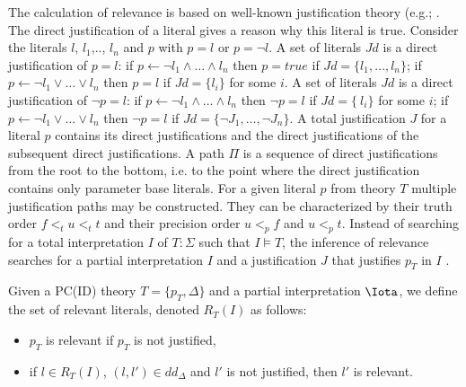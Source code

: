 The calculation of relevance is based on well-known justification theory (e.g.; \cite{Denecker93, Denecker2015}.
The direct justification of a literal gives a reason why this literal is true.
Consider the literals $l$, $l_1$,.., $l_n$ and $p$ with $p=l$ or $p=\neg l$.  
A set of literals $Jd$ is a direct justification of $p = l$:
if $p \leftarrow \neg l_1 \wedge \ldots \wedge l_n$ then $p = true$ if $Jd = \{l_1, \ldots ,l_n\}$;
if $p \leftarrow \neg l_1 \vee \ldots \vee l_n$ then $p=l$ if $Jd = \{l_i\}$ for some $i$.
A set of literals $Jd$ is a direct justification of $\neg p = l$:
if $p \leftarrow \neg l_1 \wedge \ldots \wedge l_n$ then $\neg p = l$ if $Jd = \{~l_i\}$ for some $i$;  
if $p \leftarrow \neg l_1 \vee \ldots \vee l_n$ then $\neg p = l$ if $Jd = \{\neg J_1,  \ldots , \neg J_n\}$.
A total justification $J$ for a literal $p$ contains its direct justifications and the direct justifications of the subsequent direct justifications. 
A path $\Pi$ is a sequence of direct justifications from the root to the bottom, i.e. to the point where the direct justification contains only parameter base literals.
For a given literal $p$ from theory $T$ multiple justification paths may be constructed.
They can be characterized by their truth order $f <_t u <_t t$ and their precision order  $u<_p f$ and $u<_p t$.
Instead of searching for a total interpretation $I$ of $T:\Sigma$ such that $I \models T$, the inference of relevance searches for a partial interpretation $I$ and a justification $J$ that justifies $p_T$ in $I$ \cite{Jansen2016}.
\begin{definition}
\label{def1}
\cite{Jansen2016}
Given a PC(ID) theory $T = \{p_T , \Delta \}$ and a partial interpretation $\Iota$, we define the set of relevant literals, denoted $R_T(I)$ as follows:
\begin{itemize}
    \item $p_T$ is relevant if $p_T$ is not justified,
    \item if $l \in R_T(I)$, $(l,l') \in dd_\Delta$ and $l'$ is not justified, then $l'$ is relevant.
\end{itemize}
\end{definition}
